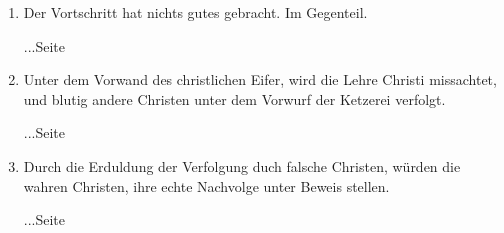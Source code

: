 \begin{enumerate}
 \item Der Vortschritt hat nichts gutes gebracht. Im Gegenteil.
 \begin{flushright}...Seite \pageref{ref:07_14_vortschritt}\end{flushright}
 \item Unter dem Vorwand des christlichen Eifer, wird die Lehre Christi missachtet, und blutig andere Christen unter dem Vorwurf der Ketzerei verfolgt.
 \begin{flushright}...Seite \pageref{ref:07_14_ketzer}\end{flushright}
 \item Durch die Erduldung der Verfolgung duch falsche Christen, würden die wahren Christen, ihre echte Nachvolge unter Beweis stellen.
 \begin{flushright}...Seite \pageref{ref:07_16_vervolgung}\end{flushright}
 
\end{enumerate}